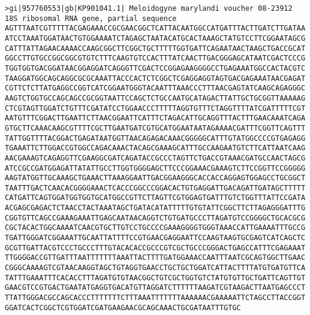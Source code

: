 \documentclass[11pt]{article}
\begin{document}
\begin{Verbatim}[commandchars=\\\{\}]
>gi|957760553|gb|KP901041.1| Meloidogyne marylandi voucher 08-23912 18S ribosomal RNA gene, partial sequence
AGTTTAATCGTTTTTACGAGAAACCGCGAACGGCTCATTACAATGGCCATGATTTACTTGATCTTGATAA
ATCCTAAATGGATAACTGTGGAAAATCTAGAGCTAATACATGCACTAAAGCTATGTCCTTCGGAATAGCG
CATTTATTAGAACAAAACCAAGCGGCTTCGGCTGCTTTTTGGTGATTCAGAATAACTAAGCTGACCGCAT
GGCCTTGTGCCGGCGGCGTGTCTTTCAAGTGTCCACTTTATCAACTTGACGGGAGCATAATCGACTCCCG
TGGTGGTGACGGATAACGGAGGATCAGGGTTCGACTCCGGAGAAGGGGCCTGAGAAATGGCCACTACGTC
TAAGGATGGCAGCAGGCGCGCAAATTACCCACTCTCGGCTCGAGGAGGTAGTGACGAGAAATAACGAGAT
CGTTCTCTTATGAGGCCGGTCATCGGAATGGGTACAATTTAAACCCTTTAACGAGTATCAAGCAGAGGGC
AAGTCTGGTGCCAGCAGCCGCGGTAATTCCAGCTCTGCCAATGCATAGACTTATTGCTGCGGTTAAAAAG
CTCGTAGTTGGATCTGTTTCGATATCCTGGAACCCTTTTTAGGTGTTTCTAGGTTTTATCGATTTTTCGT
AATGTTTCGGACTTGAATTCTTAACGGAATTCATTTCTAGACATTGCAGGTTTACTTTGAACAAATCAGA
GTGCTTCAAACAAGCGTTTTCGCTTGAATGATCGTGCATGGAATAATAGAAAACGATTTCGGTTCAGTTT
TATTGGTTTTACGGACTGAGATAATGGTTAACAGAGACAAACGGGGGCATTTGTATGGCCCCGTGAGAGG
TGAAATTCTTGGACCGTGGCCAGACAAACTACAGCGAAAGCATTTGCCAAGAATGTCTTCATTAATCAAG
AACGAAAGTCAGAGGTTCGAAGGCGATCAGATACCGCCCTAGTTCTGACCGTAAACGATGCCAACTAGCG
ATCCGCCGATGGAGATTATATTGCCTTGGTGGGGAGCTTCCCGGAAACGAAAGTCTTCCGGTTCCGGGGG
AAGTATGGTTGCAAAGCTGAAACTTAAAGGAATTGACGGAAGGGCACCACCAGGAGTGGAGCCTGCGGCT
TAATTTGACTCAACACGGGGAAACTCACCCGGCCCGGACACTGTGAGGATTGACAGATTGATAGCTTTTT
CATGATTCAGTGGATGGTGGTGCATGGCCGTTCTTAGTTCGTGGAGTGATTTGTCTGGTTTATTCCGATA
ACGAGCGAGACTCTAACCTACTAAATAGCTGATACATATTTTTGTGTATTCGGCTTCTTAGAGGGATTTG
CGGTGTTCAGCCGAAAGAAATTGAGCAATAACAGGTCTGTGATGCCCTTAGATGTCCGGGGCTGCACGCG
CGCTACACTGGCAAAATCAACGTGCTTGTCCTGCCCCGAAAGGGGTGGGTAAACCATTGAAAATTTGCCG
TGATTGGGATCGGAAATTGCAATTATTTTCCGTGAACGAGGAATTCCAAGTAAGTGCGAGTCATCAGCTC
GCGTTGATTACGTCCCTGCCCTTTGTACACACCGCCCGTCGCTGCCCGGGACTGAGCCATTTCGAGAAAT
TTGGGGACCGTTGATTTAATTTTTTTAAATTACTTTTGATGGAAACCAATTTAATCGCAGTGGCTTGAAC
CGGGCAAAAGTCGTAACAAGGTAGCTGTAGGTGAACCTGCTGCTGGATCATTACTTTTATGTGATGTTCA
TATTTGAAATTTCACACCTTTAGATGTGTAACGGCTGTCGCTGGTGTCTATGTGTTGCTGATTCAGTTGT
GAACGTCCGTGACTGAATATGAGGTGACATGTTAGGATCTTTTTTAAGATCGTAAGACTTAATGAGCCCT
TTATTGGGACGCCAGCACCCTTTTTTTCTTTAAATTTTTTTAAAAAACGAAAAATTCTAGCCTTACCGGT
GGATCACTCGGCTCGTGGATCGATGAAGAACGCAGCAAACTGCGATAATTTGTGC


\end{Verbatim}
\end{document}
